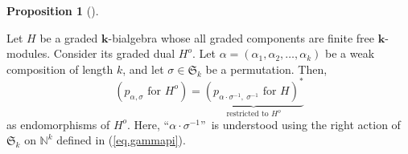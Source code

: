 \documentclass[numbers=enddot,12pt,final,onecolumn,notitlepage]{scrartcl}%
\theoremstyle{definition}
\newtheorem{prop}[theo]{Proposition}
\newenvironment{proposition}[1][]
{\begin{prop}[#1]\begin{leftbar}}
{\end{leftbar}\end{prop}}
\begin{document}
\begin{proposition}
\label{prop.pas-on-dual}Let $H$ be a graded $\mathbf{k}$-bialgebra whose all
graded components are finite free $\mathbf{k}$-modules. Consider its graded
dual $H^{o}$. Let $\alpha=\left(  \alpha_{1},\alpha_{2},\ldots,\alpha
_{k}\right)  $ be a weak composition of length $k$, and let $\sigma
\in\mathfrak{S}_{k}$ be a permutation. Then,%
\[
\left(  p_{\alpha,\sigma}\text{ for }H^{o}\right)  =\underbrace{\left(
p_{\alpha\cdot\sigma^{-1},\ \sigma^{-1}}\text{ for }H\right)  ^{\ast}%
}_{\text{restricted to }H^{o}}%
\]
as endomorphisms of $H^{o}$. Here, \textquotedblleft$\alpha\cdot\sigma^{-1}%
$\textquotedblright\ is understood using the right action of $\mathfrak{S}%
_{k}$ on $\mathbb{N}^{k}$ defined in (\ref{eq.gammapi}).
\end{proposition}
\end{document}
